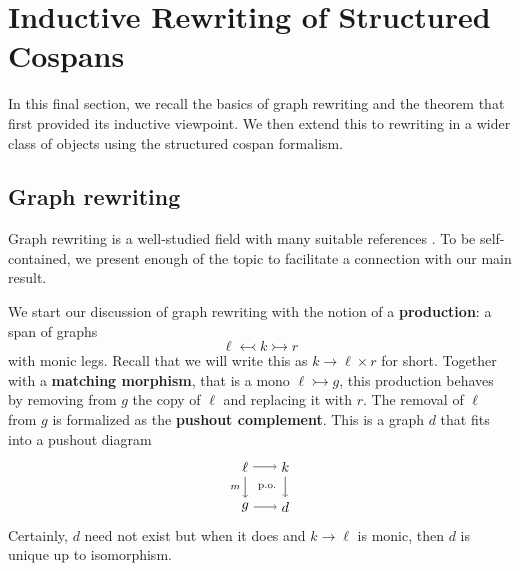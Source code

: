\documentclass{amsart}
\newcommand{\defn}[1]{\textbf{#1}}
\newcommand{\monicto}{\rightarrowtail}
\newcommand{\monicgets}{\leftarrowtail}
\newcommand{\spn}[3]{#2 \to #1 \times #3}
\theoremstyle{remark}
\theoremstyle{definition}
\begin{document}

\section{Inductive Rewriting of Structured Cospans}
\label{sec:inductive-rewriting-structured-cospans}

In this final section, we recall the basics of graph rewriting and the
theorem that first provided its inductive viewpoint. We then extend
this to rewriting in a wider class of objects using the structured
cospan formalism.

\subsection{Graph rewriting}
\label{sec:Graph-Rewriting}

Graph rewriting is a well-studied field with many suitable references
\cite{Ehrig_GraphGram,DblPushoutRevis}. To be self-contained, we
present enough of the topic to facilitate a connection with our main
result.

We start our discussion of graph rewriting with the notion of a
\defn{production}: a span of graphs
%
\[
  \ell \monicgets k \monicto r
\]
%
with monic legs. Recall that we will write this as $ \spn{\ell}{k}{r}
$ for short. Together with a \defn{matching morphism}, that is a
mono $ \ell \monicto g $, this production behaves by removing from
$ g $ the copy of $ \ell $ and replacing it with $ r $.  The removal
of $ \ell $ from $ g $ is formalized as the \defn{pushout complement}.
This is a graph $ d $ that fits into a pushout diagram
%
\[
  \begin{tikzpicture}
    \node (1) at (0,1) {$ \ell $};
    \node (2) at (1,1) {$ k $};
    \node (3) at (0,0) {$ g $};
    \node (4) at (1,0) {$ d $};
    \draw [->] (1) to node [] {\scriptsize{$  $}} (2);
    \draw [->] (1) to node [left] {\scriptsize{$ m $}} (3);
    \draw [->] (3) to node [] {\scriptsize{$  $}} (4);
    \draw [->] (2) to node [] {\scriptsize{$  $}} (4);
    \node () at (0.5,0.5) {\scriptsize{ p.o. }};
  \end{tikzpicture}
\]
% 
Certainly, $ d $ need not exist but when it does and
$ k \to \ell $ is monic, then $ d $ is unique up to isomorphism.
\end{document}
